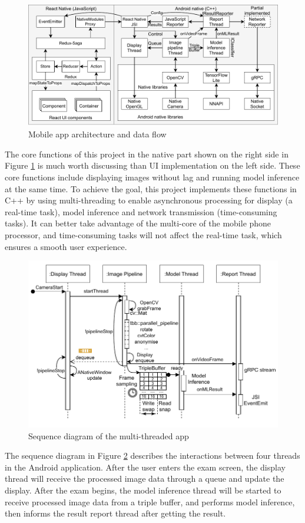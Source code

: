 \begin{figure}[!ht]
    \centering
    \includegraphics[width=.9\textwidth]{implementation/imgs/4-mobile-arch.pdf}
    \caption{Mobile app architecture and data flow}
    \label{fig:4-mobile-arch}
\end{figure}

The core functions of this project in the native part shown on the right side in Figure \ref{fig:4-mobile-arch} is much worth discussing than UI implementation on the left side.
These core functions include displaying images without lag and running model inference at the same time.
To achieve the goal, this project implements these functions in C++ by using multi-threading to enable asynchronous processing for display (a real-time task), model inference and network transmission (time-consuming tasks).
It can better take advantage of the multi-core of the mobile phone processor, and time-consuming tasks will not affect the real-time task, which ensures a smooth user experience.

\begin{figure}[!ht]
    \centering
    \includegraphics[width=.9\textwidth]{implementation/imgs/4-model-infer.pdf}
    \caption{Sequence diagram of the multi-threaded app}
    \label{fig:4-model-infer}
\end{figure}
The sequence diagram in Figure \ref{fig:4-model-infer} describes the interactions between four threads in the Android application.
After the user enters the exam screen, the display thread will receive the processed image data through a queue and update the display.
After the exam begins, the model inference thread will be started to receive processed image data from a triple buffer, and performs model inference, then informs the result report thread after getting the result.

